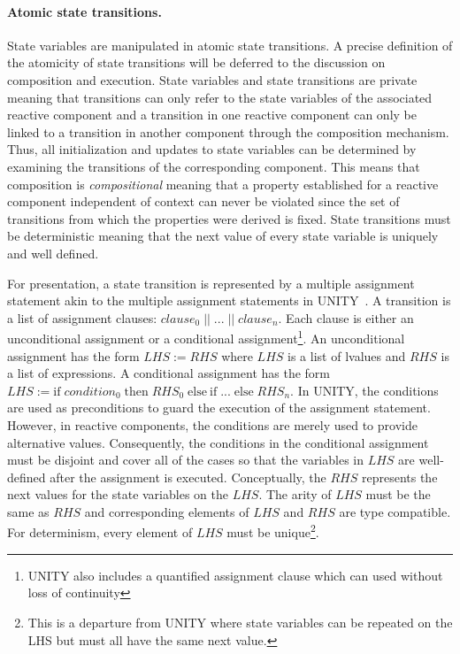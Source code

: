 \paragraph{Atomic state transitions.}
State variables are manipulated in atomic state transitions.
A precise definition of the atomicity of state transitions will be deferred to the discussion on composition and execution.
State variables and state transitions are private meaning that transitions can only refer to the state variables of the associated reactive component and a transition in one reactive component can only be linked to a transition in another component through the composition mechanism.
Thus, all initialization and updates to state variables can be determined by examining the transitions of the corresponding component.
This means that composition is \emph{compositional} meaning that a property established for a reactive component independent of context can never be violated since the set of transitions from which the properties were derived is fixed.
State transitions must be deterministic meaning that the next value of every state variable is uniquely and well defined.

For presentation, a state transition is represented by a multiple assignment statement akin to the multiple assignment statements in UNITY~\cite{chandy1989parallel}.
A transition is a list of assignment clauses: $clause_0 \; || \; ... \; || \; clause_n $.
Each clause is either an unconditional assignment or a conditional assignment\footnote{UNITY also includes a quantified assignment clause which can used without loss of continuity}.
An unconditional assignment has the form $LHS := RHS$ where $LHS$ is a list of lvalues and $RHS$ is a list of expressions.
A conditional assignment has the form $LHS := \mathrm{if} \; condition_0 \; \mathrm{then} \; RHS_0 \; \mathrm{else~if} \; ... \; \mathrm{else} \; RHS_n$.
In UNITY, the conditions are used as preconditions to guard the execution of the assignment statement.
However, in reactive components, the conditions are merely used to provide alternative values.
Consequently, the conditions in the conditional assignment must be disjoint and cover all of the cases so that the variables in $LHS$ are well-defined after the assignment is executed.
Conceptually, the $RHS$ represents the next values for the state variables on the $LHS$.
The arity of $LHS$ must be the same as $RHS$ and corresponding elements of $LHS$ and $RHS$ are type compatible.
For determinism, every element of $LHS$ must be unique\footnote{This is a departure from UNITY where state variables can be repeated on the LHS but must all have the same next value.}.

